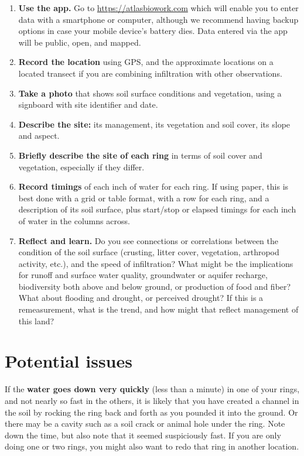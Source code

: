 \documentclass[11pt,letterpaper,twoside,onecolumn]{memoir}
\begin{document}
\begin{enumerate}
\item \textbf{Use the app.} Go to \url{https://atlasbiowork.com} which will enable you to enter data with a smartphone or computer, although we recommend having backup options in case your mobile device's battery dies. Data entered via the app will be public, open, and mapped.

\item \textbf{Record the location} using GPS, and the approximate locations on a located transect if you are combining infiltration with other observations.

\item \textbf{Take a photo} that shows soil surface conditions and vegetation, using a signboard with site identifier and date.

\item \textbf{Describe the site:} its management, its vegetation and soil cover, its slope and aspect.

\item \textbf{Briefly describe the site of each ring} in terms of soil cover and vegetation, especially if they differ.

\item \textbf{Record timings} of each inch of water for each ring. If using paper, this is best done with a grid or table format, with a row for each ring, and a description of its soil surface, plus start/stop or elapsed timings for each inch of water in the columns across. 

\item \textbf{Reflect and learn.} Do you see connections or correlations between the condition of the soil surface (crusting, litter cover, vegetation, arthropod activity, etc.), and the speed of infiltration? What might be the implications for runoff and surface water quality, groundwater or aquifer recharge, biodiversity both above and below ground, or production of food and fiber? What about flooding and drought, or perceived drought? If this is a remeasurement, what is the trend, and how might that reflect management of this land?

\end{enumerate}

\section*{Potential issues}
If the \textbf{water goes down very quickly} (less than a minute) in one of your rings, and not nearly so fast in the others, it is likely that you have created a channel in the soil by rocking the ring back and forth as you pounded it into the ground. Or there may be a cavity such as a soil crack or animal hole under the ring. Note down the time, but also note that it seemed suspiciously fast. If you are only doing one or two rings, you might also want to redo that ring in another location.
\end{document}
